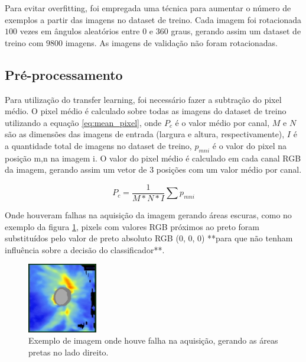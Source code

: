 \documentclass[conference]{IEEEtran}
\begin{document}
  Para evitar overfitting, foi empregada uma técnica para aumentar o número de exemplos a partir das imagens no dataset de treino. Cada imagem foi rotacionada $100$ vezes em ângulos aleatórios entre $0$ e $360$ graus, gerando assim um dataset de treino com $9800$ imagens. As imagens de validação não foram rotacionadas.

  \subsection{Pré-processamento}


  
  
  Para utilização do transfer learning, foi necessário fazer a subtração do pixel médio. O pixel médio é calculado sobre todas as imagens do dataset de treino utilizando a equação \ref{eq:mean_pixel}, onde $P_c$ é o valor médio por canal, $M$ e $N$ são as dimensões das imagens de entrada (largura e altura, respectivamente), $I$ é a quantidade total de imagens no dataset de treino, $p_{mni}$ é o valor do pixel na posição m,n na imagem i. O valor do pixel médio é calculado em cada canal RGB da imagem, gerando assim um vetor de 3 posições com um valor médio por canal.


  \begin{equation}
    P_c = \frac{1}{M * N * I} \sum p_{mni}
    \label{eq:mean_pixel}
  \end{equation}

  Onde houveram falhas na aquisição da imagem gerando áreas escuras, como no exemplo da figura \ref{fig:exemplo_falha}, pixels com valores RGB próximos ao preto foram substituídos pelo valor de preto absoluto RGB (0, 0, 0) **para que não tenham influência sobre a decisão do classificador**.

  \begin{figure}[!tp]
    \centering
    \includegraphics[width=1.2in]{img/falha.png}
    \caption{Exemplo de imagem onde houve falha na aquisição, gerando as áreas pretas no lado direito.}
    \label{fig:exemplo_falha}
  \end{figure}
\end{document}
